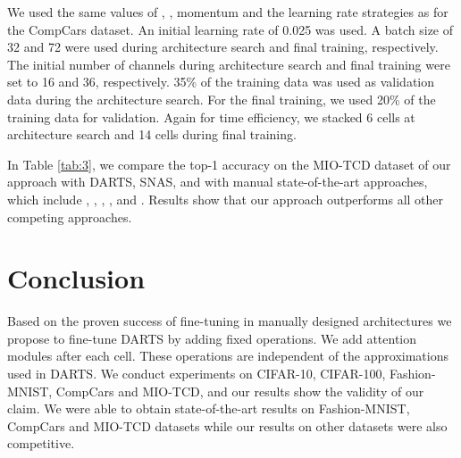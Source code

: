 \documentclass[10pt,a4paper,conference]{IEEEtran}
\begin{document}
We used the same values of , , momentum and the learning rate strategies as for the CompCars dataset. An initial learning rate of 0.025 was used. A batch size of 32 and 72 were used during architecture search and final training, respectively. The initial number of channels during architecture search and final training were set to 16 and 36, respectively. 35\% of the training data was used as validation data during the architecture search. For the final training, we used 20\% of the training data for validation. Again for time efficiency, we stacked 6 cells at architecture search and 14 cells during final training.

In Table \ref{tab:3}, we compare the top-1 accuracy on the MIO-TCD \cite{8387876:4} dataset of our approach with DARTS\cite{liu2018darts:6}, SNAS\cite{xie2018snas:4}, and with manual state-of-the-art approaches, which include \cite{chollet2017xception:44}, \cite{theagarajan2017eden:45}, \cite{kim2017vehicle:46}, \cite{taek2017deep:47}, and \cite{jung2017resnet:48}. Results show that our approach outperforms all other competing approaches.

\section{Conclusion}
Based on the proven success of fine-tuning in manually designed architectures we propose to fine-tune DARTS by adding fixed operations. We add attention modules after each cell. These operations are independent of the approximations used in DARTS. We conduct experiments on CIFAR-10, CIFAR-100, Fashion-MNIST, CompCars and MIO-TCD, and our results show the validity of our claim. We were able to obtain state-of-the-art results on Fashion-MNIST, CompCars and MIO-TCD datasets while our results on other datasets were also competitive.
   
\small{}


\end{document}
